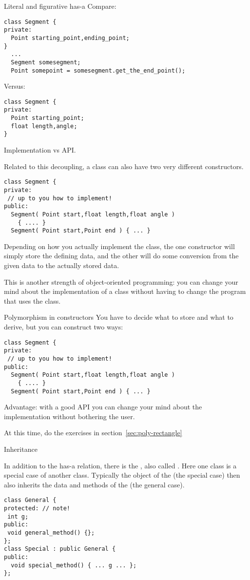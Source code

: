 \begin{slide}{Literal and figurative has-a}
  \label{sl:obj-hasa-ish}
\small
Compare:
\begin{verbatim}
class Segment {
private:
  Point starting_point,ending_point;
}
  ...
  Segment somesegment;
  Point somepoint = somesegment.get_the_end_point();
\end{verbatim}
  Versus:
\begin{verbatim}
class Segment {
private:
  Point starting_point;
  float length,angle;
}
\end{verbatim}
Implementation vs API.
\end{slide}

Related to this decoupling, a class can also have two very different constructors.
\begin{verbatim}
class Segment {
private:
 // up to you how to implement!
public:
  Segment( Point start,float length,float angle )
    { .... }
  Segment( Point start,Point end ) { ... }
\end{verbatim}
Depending on how you actually implement the class, the one constructor
will simply store the defining data, and the other will do some
conversion from the given data to the actually stored data.

This is another strength of object-oriented programming: you can
change your mind about the implementation of a class without having
to change the program that uses the class.

\begin{slide}{Polymorphism in constructors}
  \label{sl:obj-poly-construct}
  You have to decide what to store and what to derive, but you can
  construct two ways:
\begin{verbatim}
class Segment {
private:
 // up to you how to implement!
public:
  Segment( Point start,float length,float angle )
    { .... }
  Segment( Point start,Point end ) { ... }
\end{verbatim}
Advantage: with a good API you can change your mind about the
implementation without bothering the user.
\end{slide}

At this time, do the exercises in section~\ref{sec:poly-rectangle}

 {Inheritance}
\label{sec:inheritance}

In addition to the has-a relation, there is the , also called . Here one class is
a special case of another class.
Typically the object of the  (the special
case) then also inherits the data and methods of the
 (the general case).
\begin{verbatim}
class General {
protected: // note!
 int g;
public:
 void general_method() {};
};
class Special : public General {
public:
  void special_method() { ... g ... };
};
\end{verbatim}


